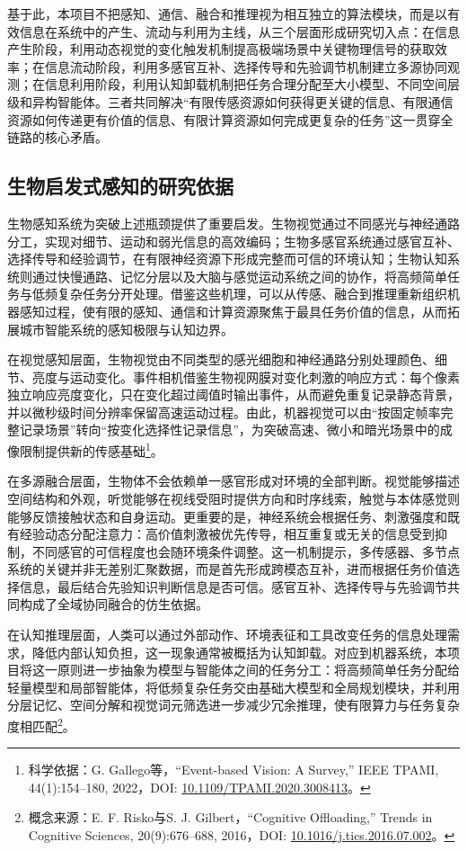 基于此，本项目不把感知、通信、融合和推理视为相互独立的算法模块，而是以有效信息在系统中的产生、流动与利用为主线，从三个层面形成研究切入点：在信息产生阶段，利用动态视觉的变化触发机制提高极端场景中关键物理信号的获取效率；在信息流动阶段，利用多感官互补、选择传导和先验调节机制建立多源协同观测；在信息利用阶段，利用认知卸载机制把任务合理分配至大小模型、不同空间层级和异构智能体。三者共同解决“有限传感资源如何获得更关键的信息、有限通信资源如何传递更有价值的信息、有限计算资源如何完成更复杂的任务”这一贯穿全链路的核心矛盾。




\subsection{生物启发式感知的研究依据}

生物感知系统为突破上述瓶颈提供了重要启发。生物视觉通过不同感光与神经通路分工，实现对细节、运动和弱光信息的高效编码；生物多感官系统通过感官互补、选择传导和经验调节，在有限神经资源下形成完整而可信的环境认知；生物认知系统则通过快慢通路、记忆分层以及大脑与感觉运动系统之间的协作，将高频简单任务与低频复杂任务分开处理。借鉴这些机理，可以从传感、融合到推理重新组织机器感知过程，使有限的感知、通信和计算资源聚焦于最具任务价值的信息，从而拓展城市智能系统的感知极限与认知边界。

在视觉感知层面，生物视觉由不同类型的感光细胞和神经通路分别处理颜色、细节、亮度与运动变化。事件相机借鉴生物视网膜对变化刺激的响应方式：每个像素独立响应亮度变化，只在变化超过阈值时输出事件，从而避免重复记录静态背景，并以微秒级时间分辨率保留高速运动过程。由此，机器视觉可以由“按固定帧率完整记录场景”转向“按变化选择性记录信息”，为突破高速、微小和暗光场景中的成像限制提供新的传感基础\footnote{科学依据：G. Gallego等，``Event-based Vision: A Survey,'' IEEE TPAMI, 44(1):154--180, 2022，DOI: \href{https://doi.org/10.1109/TPAMI.2020.3008413}{10.1109/TPAMI.2020.3008413}。}。

在多源融合层面，生物体不会依赖单一感官形成对环境的全部判断。视觉能够描述空间结构和外观，听觉能够在视线受阻时提供方向和时序线索，触觉与本体感觉则能够反馈接触状态和自身运动。更重要的是，神经系统会根据任务、刺激强度和既有经验动态分配注意力：高价值刺激被优先传导，相互重复或无关的信息受到抑制，不同感官的可信程度也会随环境条件调整。这一机制提示，多传感器、多节点系统的关键并非无差别汇聚数据，而是首先形成跨模态互补，进而根据任务价值选择信息，最后结合先验知识判断信息是否可信。感官互补、选择传导与先验调节共同构成了全域协同融合的仿生依据。

在认知推理层面，人类可以通过外部动作、环境表征和工具改变任务的信息处理需求，降低内部认知负担，这一现象通常被概括为认知卸载。对应到机器系统，本项目将这一原则进一步抽象为模型与智能体之间的任务分工：将高频简单任务分配给轻量模型和局部智能体，将低频复杂任务交由基础大模型和全局规划模块，并利用分层记忆、空间分解和视觉词元筛选进一步减少冗余推理，使有限算力与任务复杂度相匹配\footnote{概念来源：E. F. Risko与S. J. Gilbert，``Cognitive Offloading,'' Trends in Cognitive Sciences, 20(9):676--688, 2016，DOI: \href{https://doi.org/10.1016/j.tics.2016.07.002}{10.1016/j.tics.2016.07.002}。}。


